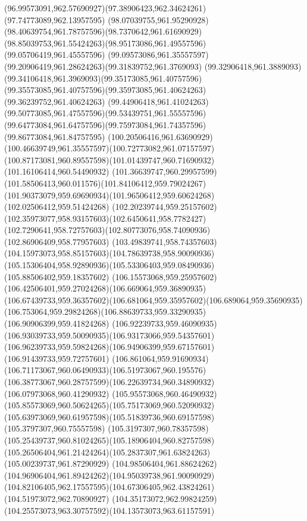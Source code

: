 {{\curveto(96.99573091,962.57690927)(97.38906423,962.34624261)(97.74773089,962.13957595)
\curveto(98.07039755,961.95290928)(98.40639754,961.78757596)(98.7370642,961.61690929)
\curveto(98.85039753,961.55424263)(98.95173086,961.49557596)(99.05706419,961.45557596)
\curveto(99.09573086,961.35557597)(99.20906419,961.28624263)(99.31839752,961.3769093)
\curveto(99.32906418,961.3889093)(99.34106418,961.3969093)(99.35173085,961.40757596)
\curveto(99.35573085,961.40757596)(99.35973085,961.40624263)(99.36239752,961.40624263)
\curveto(99.44906418,961.41024263)(99.50773085,961.47557596)(99.53439751,961.55557596)
\curveto(99.64773084,961.64757596)(99.75973084,961.74357596)(99.86773084,961.84757595)
\curveto(100.20506416,961.63690929)(100.46639749,961.35557597)(100.72773082,961.07157597)
\curveto(100.87173081,960.89557598)(101.01439747,960.71690932)(101.16106414,960.54490932)
\curveto(101.36639747,960.29957599)(101.58506413,960.011576)(101.84106412,959.79024267)
\curveto(101.90373079,959.69690934)(101.96506412,959.60624268)(102.02506412,959.51424268)
\curveto(102.20239744,959.25157602)(102.35973077,958.93157603)(102.6450641,958.7782427)
\curveto(102.7290641,958.72757603)(102.80773076,958.74090936)(102.86906409,958.77957603)
\curveto(103.49839741,958.74357603)(104.15973073,958.85157603)(104.78639738,958.90090936)
\curveto(105.15306404,958.92890936)(105.53306403,959.08490936)(105.88506402,959.18357602)
\curveto(106.15573068,959.25957602)(106.42506401,959.27024268)(106.669064,959.36890935)
\curveto(106.67439733,959.36357602)(106.681064,959.35957602)(106.689064,959.35690935)
\curveto(106.753064,959.29824268)(106.88639733,959.33290935)(106.90906399,959.41824268)
\curveto(106.92239733,959.46090935)(106.93039733,959.50090935)(106.93173066,959.54357601)
\curveto(106.96239733,959.59824268)(106.94906399,959.67157601)(106.91439733,959.72757601)
\curveto(106.861064,959.91690934)(106.71173067,960.06490933)(106.51973067,960.195576)
\curveto(106.38773067,960.28757599)(106.22639734,960.34890932)(106.07973068,960.41290932)
\curveto(105.95573068,960.46490932)(105.85573069,960.50624265)(105.75173069,960.52090932)
\curveto(105.63973069,960.61957598)(105.51839736,960.69157598)(105.3797307,960.75557598)
\curveto(105.3197307,960.78357598)(105.25439737,960.81024265)(105.18906404,960.82757598)
\curveto(105.26506404,961.21424264)(105.2837307,961.63824263)(105.00239737,961.87290929)
\curveto(104.98506404,961.88624262)(104.96906404,961.89424262)(104.95039738,961.90090929)
\curveto(104.82106405,962.17557595)(104.67306405,962.43824261)(104.51973072,962.70890927)
\curveto(104.35173072,962.99824259)(104.25573073,963.30757592)(104.13573073,963.61157591)
}}
